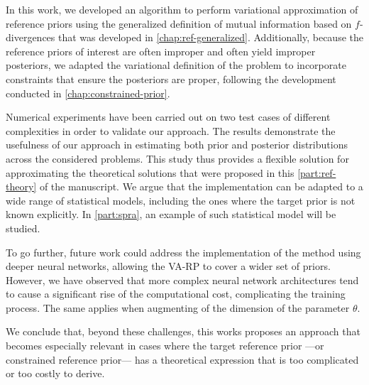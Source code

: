 In this work, we developed an algorithm to perform variational approximation of reference priors using the generalized definition of mutual information based on $f$-divergences that was developed in \cref{chap:ref-generalized}.
Additionally, because the reference priors of interest are often improper and often yield improper posteriors, we adapted the variational definition of the problem to incorporate constraints that ensure the posteriors are proper, following the development conducted in \cref{chap:constrained-prior}. 


Numerical experiments have been carried out on two test cases of different complexities in order to validate our approach.
The results demonstrate the usefulness of our approach in estimating both prior and posterior distributions across the considered problems. %
This study thus provides a flexible  solution for approximating the theoretical solutions that were proposed in this \cref{part:ref-theory} of the manuscript.
We argue that the implementation can be adapted to a wide range of statistical models, including the ones where the target prior is not known explicitly.
In \cref{part:spra}, an example of such statistical model will be studied.


To go further, future work could address the implementation of the method using deeper neural networks, %
allowing the VA-RP to cover a wider set of priors. However, we have observed that more complex neural network architectures
tend to cause a  significant rise of the
computational cost, complicating the training process.
The same applies when augmenting of the dimension of the parameter $\theta$.




We conclude that, beyond these challenges, this works proposes an approach that becomes especially relevant in cases where the target reference prior ---or constrained reference prior--- has a theoretical expression that is too complicated or too costly to derive.




